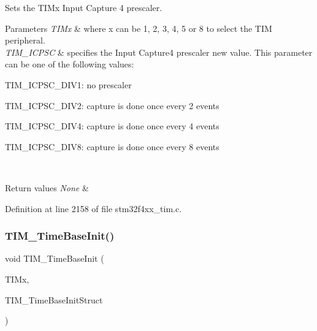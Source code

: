 Sets the T\+I\+Mx Input Capture 4 prescaler. 


\begin{DoxyParams}{Parameters}
{\em T\+I\+Mx} & where x can be 1, 2, 3, 4, 5 or 8 to select the T\+IM peripheral. \\
\hline
{\em T\+I\+M\+\_\+\+I\+C\+P\+SC} & specifies the Input Capture4 prescaler new value. This parameter can be one of the following values\+: \begin{DoxyItemize}
\item T\+I\+M\+\_\+\+I\+C\+P\+S\+C\+\_\+\+D\+I\+V1\+: no prescaler \item T\+I\+M\+\_\+\+I\+C\+P\+S\+C\+\_\+\+D\+I\+V2\+: capture is done once every 2 events \item T\+I\+M\+\_\+\+I\+C\+P\+S\+C\+\_\+\+D\+I\+V4\+: capture is done once every 4 events \item T\+I\+M\+\_\+\+I\+C\+P\+S\+C\+\_\+\+D\+I\+V8\+: capture is done once every 8 events \end{DoxyItemize}
\\
\hline
\end{DoxyParams}

\begin{DoxyRetVals}{Return values}
{\em None} & \\
\hline
\end{DoxyRetVals}


Definition at line 2158 of file stm32f4xx\+\_\+tim.\+c.

\mbox{\label{group___t_i_m_ga83fd58c9416802d9638bbe1715c98932}} 
\subsubsection{\texorpdfstring{T\+I\+M\+\_\+\+Time\+Base\+Init()}{TIM\_TimeBaseInit()}}
{\footnotesize\ttfamily void T\+I\+M\+\_\+\+Time\+Base\+Init (\begin{DoxyParamCaption}\item[{\hyperlink{struct_t_i_m___type_def}{T\+I\+M\+\_\+\+Type\+Def} $\ast$}]{T\+I\+Mx,  }\item[{\hyperlink{struct_t_i_m___time_base_init_type_def}{T\+I\+M\+\_\+\+Time\+Base\+Init\+Type\+Def} $\ast$}]{T\+I\+M\+\_\+\+Time\+Base\+Init\+Struct }\end{DoxyParamCaption})}




